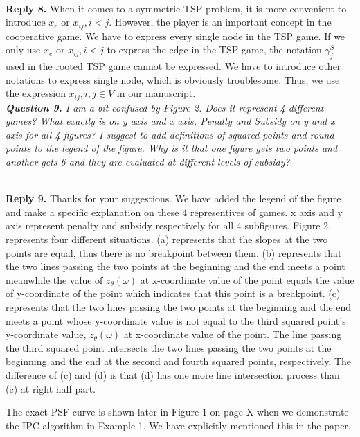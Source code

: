 \documentclass[11pt]{article}
\begin{document}
\\[2mm]
\noindent \textbf{Reply 8.}
When it comes to a symmetric TSP problem, it is more convenient to introduce $x_e$ or $x_{ij}, i<j$.
However, the player is an important concept in the cooperative game.
We have to express every single node in the TSP game.
If we only use $x_e$ or $x_{ij}, i<j$ to express the edge in the TSP game, the notation $\gamma^{S}_j$ used in the rooted TSP game cannot be expressed. We have to introduce other notations to express single node, which is obviously troublesome.
Thus, we use the expression $x_{ij}, i,j \in V$ in our manuscript.
\\[4mm]


\noindent \textit{\textbf{Question 9.}
I am a bit confused by Figure 2. Does it represent 4 different games? What exactly is on y axis and x axis, Penalty and Subsidy on y and x axis for all 4 figures? I suggest to add definitions of squared points and round points to the legend of the figure. Why is it that one figure gets two points and another gets 6 and they are evaluated at different levels of subsidy?}

\\[2mm]
\noindent \textbf{Reply 9.}
Thanks for your suggestions.
We have added the legend of the figure and make a specific explanation on these 4 representives of games.
x axis and y axis represent penalty and subsidy respectively for all 4 subfigures.
Figure 2. represents four different situations. (a) represents that the slopes at the two points are equal, thus there is no breakpoint between them. (b) represents that the two lines passing the two points at the beginning and the end meets a point meanwhile the value of $z_\theta(\omega)$ at x-coordinate value of the point equals the value of y-coordinate of the point which indicates that this point is a breakpoint. (c) represents that the two lines passing the two points at the beginning and the end meets a point whose y-coordinate value is not equal to the third squared point's y-coordinate value, $z_\theta(\omega)$ at x-coordinate value of the point. The line passing the third squared point intersects the two lines passing the two points at the beginning and the end at the second and fourth squared points, respectively. The difference of (c) and (d) is that (d) has one more line intersection process than (c) at right half part.


The exact PSF curve is shown later in Figure 1 on page X when we demonstrate the IPC algorithm in Example 1. We have explicitly mentioned this in the paper.
\end{document}

